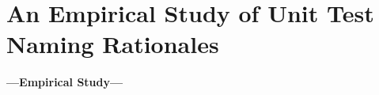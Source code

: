 \section{An Empirical Study of Unit Test Naming Rationales}
\label{sec:emp-study}
\textbf{---Empirical Study---}